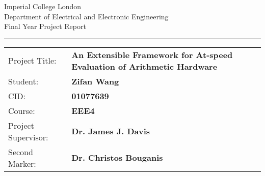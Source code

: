 \begin{titlepage}
  { \Large
    Imperial College London\\[17pt]
    Department of Electrical and Electronic Engineering\\[17pt]
    Final Year Project Report
  }

  \rule{\columnwidth}{3pt}
  \vfill
  \centering
  
  \vfill

  \begin{table}[h]
  \def\arraystretch{1.8}
    \begin{tabular}{p{40mm} >{\bfseries} p{\dimexpr\columnwidth-40mm}}
      Project Title: & An Extensible Framework for \newline At-speed Evaluation of Arithmetic Hardware \\
      Student:       & Zifan Wang \\
      CID:           & 01077639 \\
      Course:        & EEE4 \\
      Project Supervisor: & Dr. James J. Davis \\
      Second Marker: & Dr. Christos Bouganis
    \end{tabular}
  \end{table}
\end{titlepage}